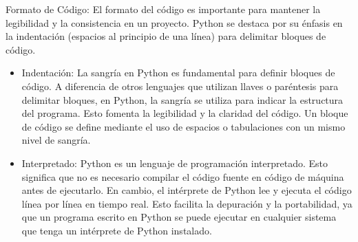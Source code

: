 Formato de Código: El formato del código es importante para mantener la legibilidad y la consistencia en un proyecto. Python se destaca por su énfasis en la indentación (espacios al principio de una línea) para delimitar bloques de código. 
\begin{itemize}
    \item Indentación: La sangría en Python es fundamental para definir bloques de código. A diferencia de otros lenguajes que utilizan llaves o paréntesis para delimitar bloques, en Python, la sangría se utiliza para indicar la estructura del programa. Esto fomenta la legibilidad y la claridad del código. Un bloque de código se define mediante el uso de espacios o tabulaciones con un mismo nivel de sangría. 
\begin{figure}[h]
    \centering
    \end{figure}
    \item Interpretado: Python es un lenguaje de programación interpretado. Esto significa que no es necesario compilar el código fuente en código de máquina antes de ejecutarlo. En cambio, el intérprete de Python lee y ejecuta el código línea por línea en tiempo real. Esto facilita la depuración y la portabilidad, ya que un programa escrito en Python se puede ejecutar en cualquier sistema que tenga un intérprete de Python instalado.
  \begin{figure}[h]
      \centering
\end{figure}
\end{itemize}
